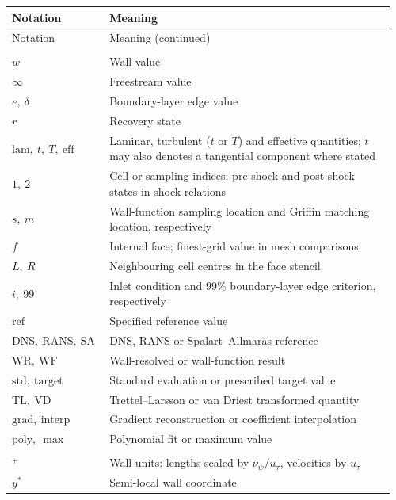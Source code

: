 \begin{longtable}{@{}p{0.24\linewidth}p{0.72\linewidth}@{}}
\toprule
Notation & Meaning \\
\midrule
\endfirsthead
\toprule
Notation & Meaning (continued) \\
\midrule
\endhead
\bottomrule
\endlastfoot
\multicolumn{2}{@{}l}{\textbf{Subscripts}} \\[2pt]
\(w\) & Wall value \\
\(\infty\) & Freestream value \\
\(e,\ \delta\) & Boundary-layer edge value \\
\(r\) & Recovery state \\
\(\mathrm{lam},\ t,\ T,\ \mathrm{eff}\) & Laminar, turbulent (\(t\) or \(T\)) and effective quantities; \(t\) may also denotes a tangential component where stated \\
\(1,\ 2\) & Cell or sampling indices; pre-shock and post-shock states in shock relations \\
\(s,\ m\) & Wall-function sampling location and Griffin matching location, respectively \\
\(f\) & Internal face; finest-grid value in mesh comparisons \\
\(L,\ R\) & Neighbouring cell centres in the face stencil \\
\(i,\ 99\) & Inlet condition and 99\% boundary-layer edge criterion, respectively \\
\(\mathrm{ref}\) & Specified reference value \\
\(\mathrm{DNS},\ \mathrm{RANS},\ \mathrm{SA}\) & DNS, RANS or Spalart--Allmaras reference \\
\(\mathrm{WR},\ \mathrm{WF}\) & Wall-resolved or wall-function result \\
\(\mathrm{std},\ \mathrm{target}\) & Standard evaluation or prescribed target value \\
\(\mathrm{TL},\ \mathrm{VD}\) & Trettel--Larsson or van Driest transformed quantity \\
\(\mathrm{grad},\ \mathrm{interp}\) & Gradient reconstruction or coefficient interpolation \\
\(\mathrm{poly},\ \max\) & Polynomial fit or maximum value \\
\addlinespace
\multicolumn{2}{@{}l}{\textbf{Superscripts, accents and operators}} \\[2pt]
\({}^{+}\) & Wall units: lengths scaled by \(\nu_w/u_\tau\), velocities by \(u_\tau\) \\
\(y^*\) & Semi-local wall coordinate \\

\end{longtable}
